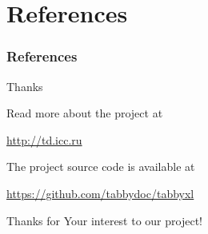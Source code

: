 \documentclass[10pt]{beamer}
\begin{document}
\section{References}

\begin{frame}[allowframebreaks]
\frametitle{References}
\tiny


\end{frame}

\begin{frame}
\Huge{\centerline{Thanks}}
\bigskip
\footnotesize{\centerline{Read more about the project at}}
\scriptsize{\centerline{\url{http://td.icc.ru}}}

\bigskip
\footnotesize{\centerline{The project source code is available at}}
\scriptsize{\centerline{\url{https://github.com/tabbydoc/tabbyxl}}}
\end{frame}






\begin{frame}
  \begin{center}
  \Large Thanks for Your interest to our project!
\end{center}
\end{frame}
\end{document}

